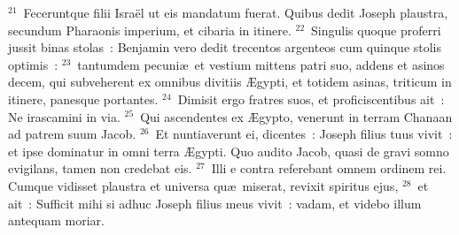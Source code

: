 ${}^{21}$~Feceruntque filii Isra\"el ut eis mandatum fuerat. Quibus dedit Joseph plaustra, secundum Pharaonis imperium, et cibaria in itinere.
${}^{22}$~Singulis quoque proferri jussit binas stolas~: Benjamin vero dedit trecentos argenteos cum quinque stolis optimis~:
${}^{23}$~tantumdem pecuni\ae\ et vestium mittens patri suo, addens et asinos decem, qui subveherent ex omnibus divitiis \AE gypti, et totidem asinas, triticum in itinere, panesque portantes.
${}^{24}$~Dimisit ergo fratres suos, et proficiscentibus ait~: Ne irascamini in via.
${}^{25}$~Qui ascendentes ex \AE gypto, venerunt in terram Chanaan ad patrem suum Jacob.
${}^{26}$~Et nuntiaverunt ei, dicentes~: Joseph filius tuus vivit~: et ipse dominatur in omni terra \AE gypti. Quo audito Jacob, quasi de gravi somno evigilans, tamen non credebat eis.
${}^{27}$~Illi e contra referebant omnem ordinem rei. Cumque vidisset plaustra et universa qu\ae\ miserat, revixit spiritus ejus,
${}^{28}$~et ait~: Sufficit mihi si adhuc Joseph filius meus vivit~: vadam, et videbo illum antequam moriar.

